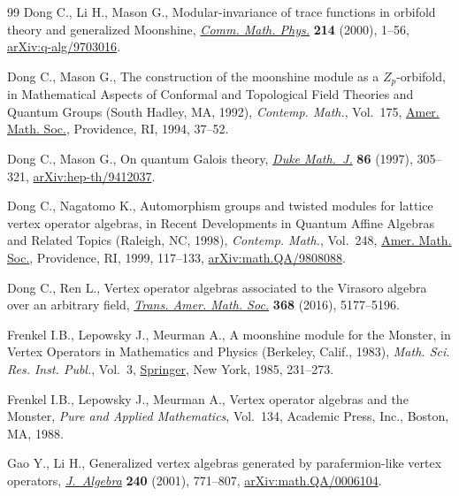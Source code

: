 \documentclass[pdftex]{sigma}
\theoremstyle{definition}
\begin{document}
\begin{thebibliography}{99}
Dong C., Li H., Mason G., Modular-invariance of trace functions in orbifold
 theory and generalized {M}oonshine, \href{https://doi.org/10.1007/s002200000242}{\textit{Comm. Math. Phys.}} \textbf{214}
 (2000), 1--56, \href{https://arxiv.org/abs/q-alg/9703016}{arXiv:q-alg/9703016}.

Dong C., Mason G., The construction of the moonshine module as a
 {$Z_p$}-orbifold, in Mathematical Aspects of Conformal and Topological Field
 Theories and Quantum Groups ({S}outh {H}adley, {MA}, 1992), \textit{Contemp.
 Math.}, Vol.~175, \href{https://doi.org/10.1090/conm/175/01836}{Amer. Math. Soc.}, Providence, RI, 1994, 37--52.

Dong C., Mason G., On quantum {G}alois theory, \href{https://doi.org/10.1215/S0012-7094-97-08609-9}{\textit{Duke Math.~J.}}
 \textbf{86} (1997), 305--321, \href{https://arxiv.org/abs/hep-th/9412037}{arXiv:hep-th/9412037}.

Dong C., Nagatomo K., Automorphism groups and twisted modules for lattice
 vertex operator algebras, in Recent Developments in Quantum Affine Algebras
 and Related Topics ({R}aleigh, {NC}, 1998), \textit{Contemp. Math.}, Vol.~248, \href{https://doi.org/10.1090/conm/248/03821}{Amer. Math. Soc.}, Providence, RI, 1999, 117--133,
 \href{https://arxiv.org/abs/math.QA/9808088}{arXiv:math.QA/9808088}.

Dong C., Ren L., Vertex operator algebras associated to the {V}irasoro algebra
 over an arbitrary field, \href{https://doi.org/10.1090/tran/6529}{\textit{Trans. Amer. Math. Soc.}} \textbf{368}
 (2016), 5177--5196.

Frenkel I.B., Lepowsky J., Meurman A., A moonshine module for the {M}onster, in
 Vertex Operators in Mathematics and Physics ({B}erkeley, {C}alif., 1983),
 \textit{Math. Sci. Res. Inst. Publ.}, Vol.~3, \href{https://doi.org/10.1007/978-1-4613-9550-8_12}{Springer}, New York, 1985,
 231--273.

Frenkel I.B., Lepowsky J., Meurman A., Vertex operator algebras and the
 {M}onster, \textit{Pure and Applied Mathematics}, Vol.~134, Academic Press,
 Inc., Boston, MA, 1988.

Gao Y., Li H., Generalized vertex algebras generated by parafermion-like vertex
 operators, \href{https://doi.org/10.1006/jabr.2001.8754}{\textit{J.~Algebra}} \textbf{240} (2001), 771--807,
 \href{https://arxiv.org/abs/math.QA/0006104}{arXiv:math.QA/0006104}.


\end{thebibliography}
\end{document}
